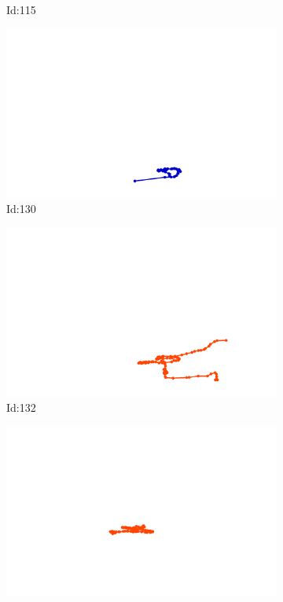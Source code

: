 \documentclass[12pt,twoside]{report}
\begin{document}
\begin{figure}
\begin{subfigure}[b]{0.20\textwidth}
\caption{Id:115}
\end{subfigure}
\begin{subfigure}[b]{0.20\textwidth}
\centering
\includegraphics[width=\textwidth]{../trajectories/130.png}
\caption{Id:130}
\end{subfigure}
\begin{subfigure}[b]{0.20\textwidth}
\centering
\includegraphics[width=\textwidth]{../trajectories/132.png}
\caption{Id:132}
\end{subfigure}
\begin{subfigure}[b]{0.20\textwidth}
\centering
\includegraphics[width=\textwidth]{../trajectories/174.png}

\end{subfigure}
\end{figure}
\end{document}
